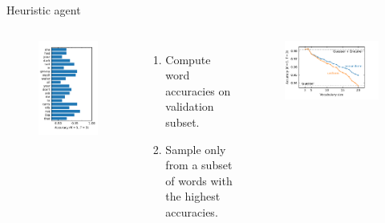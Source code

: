 \documentclass[11pt, aspectratio=169]{beamer}
\newcommand{\vimgscale}{0.8}
\begin{document}
\begin{frame}{Heuristic agent}
    \begin{columns}[b]
        \begin{figure}[htb]
            \includegraphics[scale=\vimgscale]{../plots/word_scores.pdf}
        \end{figure}
        \begin{enumerate}
            \item Compute word accuracies on validation subset.
            \item Sample only from a subset of words with the highest accuracies.
        \end{enumerate}
        \begin{figure}[htb]
            \includegraphics[scale=\vimgscale]{../plots/heuristic.pdf}
        \end{figure}
    \end{columns}
\end{frame}
\end{document}
